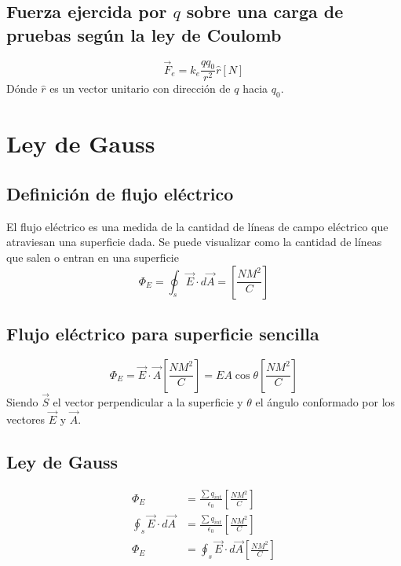 \documentclass{report}
\begin{document}
    \subsection*{Fuerza ejercida por $q$ sobre una carga de pruebas según la ley de Coulomb}
      \begin{equation*}
        \overrightarrow{F}_e=k_e\frac{qq_0}{r^2}\hat{r}[N]
      \end{equation*}
      Dónde $\hat{r}$ es un vector unitario con dirección de $q$ hacia $q_0$.


  \section*{Ley de Gauss}

    \subsection*{Definición de flujo eléctrico}
      El flujo eléctrico es una medida de la cantidad de líneas de campo eléctrico que atraviesan 
      una superficie dada. Se puede visualizar como la cantidad de líneas que salen o entran en una superficie
      \begin{equation*}
        \Phi_E=\oint_s\overrightarrow{E}\cdot d\overrightarrow{A}=\left[\frac{NM^2}{C}\right]
      \end{equation*}

    \subsection*{Flujo eléctrico para superficie sencilla}
      \begin{equation*}
        \Phi_E=\overrightarrow{E}\cdot\overrightarrow{A}\left[\frac{NM^2}{C}\right]=EA\cos{\theta}\left[\frac{NM^2}{C}\right]
      \end{equation*}
    Siendo $\overrightarrow{S}$ el vector perpendicular a la superficie y $\theta$ el ángulo conformado por los vectores
    $\overrightarrow{E}$ y $\overrightarrow{A}$.

    \subsection*{Ley de Gauss}
      \begin{align*}
        \Phi_E &=\frac{\sum q_{int}}{\epsilon_0}\left[\frac{NM^2}{C}\right]\\
        \oint_s\overrightarrow{E}\cdot d\overrightarrow{A}&=\frac{\sum q_{int}}{\epsilon_0}\left[\frac{NM^2}{C}\right]\\
        \Phi_E &=\oint_s\overrightarrow{E}\cdot d\overrightarrow{A}\left[\frac{NM^2}{C}\right]
      \end{align*}
\end{document}
